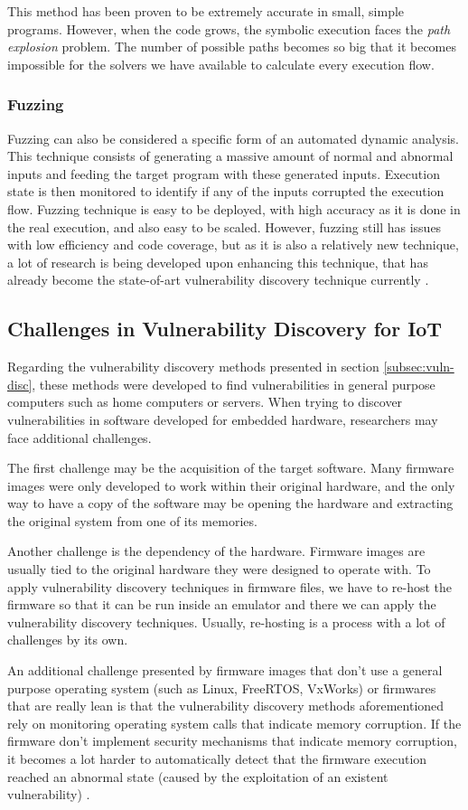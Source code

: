 This method has been proven to be extremely accurate in small, simple programs. However, when the code grows, the symbolic execution faces the \textit{path explosion} problem. The number of possible paths becomes so big that it becomes impossible for the solvers we have available to calculate every execution flow.

\subsubsection{Fuzzing}

Fuzzing can also be considered a specific form of an automated dynamic analysis. This technique consists of generating a massive amount of normal and abnormal inputs and feeding the target program with these generated inputs. Execution state is then monitored to identify if any of the inputs corrupted the execution flow. Fuzzing technique is easy to be deployed, with high accuracy as it is done in the real execution, and also easy to be scaled. However, fuzzing still has issues with low efficiency and code coverage, but as it is also a relatively new technique, a lot of research is being developed upon enhancing this technique, that has already become the state-of-art vulnerability discovery technique currently \cite{fuzzing}.


\subsection{Challenges in Vulnerability Discovery for IoT}

Regarding the vulnerability discovery methods presented in section \ref{subsec:vuln-disc}, these methods were developed to find vulnerabilities in general purpose computers such as home computers or servers. When trying to discover vulnerabilities in software developed for embedded hardware, researchers may face additional challenges.

The first challenge may be the acquisition of the target software. Many firmware images were only developed to work within their original hardware, and the only way to have a copy of the software may be opening the hardware and extracting the original system from one of its memories.

Another challenge is the dependency of the hardware. Firmware images are usually tied to the original hardware they were designed to operate with. To apply vulnerability discovery techniques in firmware files, we have to re-host the firmware so that it can be run inside an emulator and there we can apply the vulnerability discovery techniques. Usually, re-hosting is a process with a lot of challenges by its own.

An additional challenge presented by firmware images that don't use a general purpose operating system (such as Linux, FreeRTOS, VxWorks) or firmwares that are really lean is that the vulnerability discovery methods aforementioned rely on monitoring operating system calls that indicate memory corruption. If the firmware don't implement security mechanisms that indicate memory corruption, it becomes a lot harder to automatically detect that the firmware execution reached an abnormal state (caused by the exploitation of an existent vulnerability) \cite{wycinwyc}.